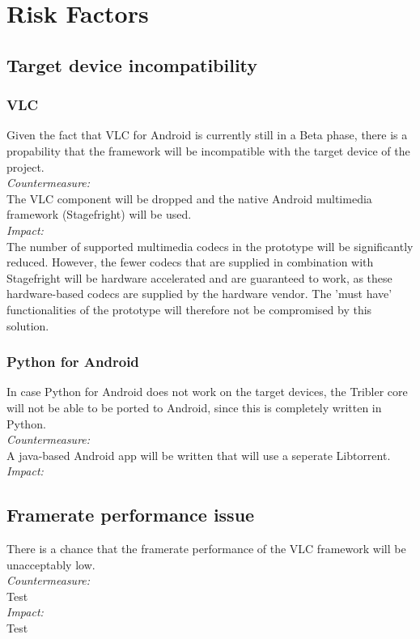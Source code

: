 \section{Risk Factors}
\subsection{Target device incompatibility}
\subsubsection{VLC}
Given the fact that VLC for Android is currently still in a Beta phase, there is a propability that the framework will be incompatible with the target device of the project.\\
\newline
\textit{Countermeasure:}\\
The VLC component will be dropped and the native Android multimedia framework (Stagefright) will be used.\\
\newline
\textit{Impact:}\\
The number of supported multimedia codecs in the prototype will be significantly reduced. However, the fewer codecs that are supplied in combination with Stagefright will be hardware accelerated and are guaranteed to work, as these hardware-based codecs are supplied by the hardware vendor. The 'must have' functionalities of the prototype will therefore not be compromised by this solution. 
\subsubsection{Python for Android}
In case Python for Android does not work on the target devices, the Tribler core will not be able to be ported to Android, since this is completely written in Python.\\
\newline
\textit{Countermeasure:}\\
A java-based Android app will be written that will use a seperate Libtorrent.\\
\newline
\textit{Impact:}\\
\subsection{Framerate performance issue}
There is a chance that the framerate performance of the VLC framework will be unacceptably low.\\
\newline
\textit{Countermeasure:}\\
Test
\\
\newline
\textit{Impact:}\\
Test





